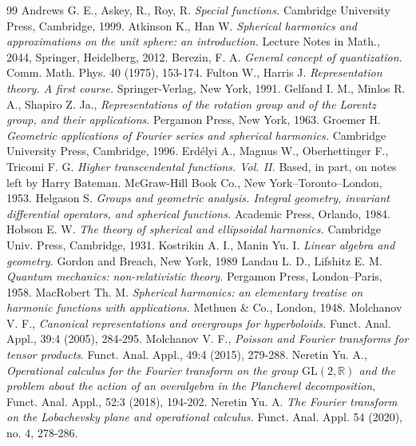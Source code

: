 \documentclass[10pt,a4paper]{amsart}
\def\GL{\mathrm  {GL}}
\def\R {{\mathbb R }}
\begin{document}
\begin{thebibliography}{99}
 Andrews G. E., Askey, R., Roy, R. {\it Special functions.} Cambridge University Press, Cambridge, 1999.
 Atkinson K., Han W. {\it Spherical harmonics and approximations on the unit sphere: an introduction.} Lecture Notes in Math., 2044, Springer, Heidelberg, 2012.
 Berezin, F. A. {\it General concept of quantization.} Comm. Math. Phys. 40 (1975), 153-174.
 Fulton W., Harris J. {\it Representation theory. A first course.} Springer-Verlag, New York, 1991.
 Gelfand I. M., Minlos R. A., Shapiro Z. Ja., {\it Representations of the rotation group and of the Lorentz group, and their applications}. Pergamon Press, New York, 1963. %
 Groemer H. {\it Geometric applications of Fourier series and spherical harmonics.} Cambridge University Press, Cambridge, 1996.
 Erd\'elyi A., Magnus W., Oberhettinger F., Tricomi F. G. {\it Higher transcendental functions. Vol. II.} Based, in part, on notes left by Harry Bateman. McGraw-Hill Book Co., New York--Toronto--London, 1953.
 Helgason S. {\it Groups and geometric analysis. Integral geometry, invariant differential operators, and spherical functions.} Academic Press, Orlando, 1984.
 Hobson E. W. {\it The theory of spherical and ellipsoidal harmonics.} Cambridge Univ. Press, Cambridge, 1931.
 Kostrikin A. I., Manin Yu. I. {\it Linear algebra and geometry.} Gordon and Breach, New York, 1989
 Landau L. D., Lifshitz E. M. {\it Quantum mechanics: non-relativistic theory.} Pergamon Press, London--Paris, 1958.
 MacRobert Th. M. {\it Spherical harmonics: an elementary treatise on harmonic functions with applications.} Methuen \& Co., London, 1948.
 Molchanov V. F., {\it Canonical representations and overgroups for hyperboloids.} Funct. Anal. Appl., 39:4 (2005), 284-295.
 Molchanov V. F., {\it Poisson and Fourier transforms for tensor products}. Funct. Anal. Appl., 49:4 (2015), 279-288.
 Neretin Yu. A., {\it Operational calculus for the Fourier transform on the group $\GL(2,\R)$ and the problem about the action of an overalgebra in the Plancherel decomposition}, Funct. Anal. Appl., 52:3 (2018), 194-202.
 Neretin Yu. A. {\it The Fourier transform on the Lobachevsky plane and operational calculus.} Funct. Anal. Appl. 54 (2020), no. 4, 278-286.

\end{thebibliography}
\end{document}

